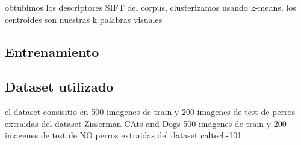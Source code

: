 \documentclass[12pt]{article}
\begin{document}
obtubimos los descriptores SIFT del corpus, clusterizamos usando k-means, los centroides son nuestras k palabras visuales

\subsection{Entrenamiento}

\subsection{Dataset utilizado}
el dataset consisitio en
500 imagenes de train y 200 imagenes de test de perros extraidas del dataset Zisserman CAts and Dogs
500 imagenes de train y 200 imagenes de test de NO perros extraidas del dataset caltech-101

\begin{comment}
En este trabajo se realizó la evaluación de un algoritmo para el reconocimiento
de piel basado en modelos estadísticos de color. 

\subsection{Modelos de color}

Una forma de modelar una característica a detectar es mediante un modelo
estadístico sobre los colores de la imagen. Un pixel con cierto valor $rgb$ es
clasificado por uno de estos modelos como ser efectivamente piel si:

\begin{equation}
    \frac{ \mathbb{P} [ rgb|skin ] }{ \mathbb{P} [ rgb | \neg skin ] } \geq
    \Theta
\end{equation}

con $\Theta$ un umbral que puede ser descrito como función del costo de tener
falsos positivos y falsos negativos:

\begin{equation}
    \Theta = \frac{c_p \mathbb{P} [\neg skin]}{c_n \mathbb{P}[skin]}
\end{equation}

Ahora bien, las distribuciones $\mathbb{P} [ rgb|skin ]$ y $\mathbb{P} [ rgb | \neg
skin ]$ pueden ser determinadas de distintas formas. En el caso de este trabajo, se
utilizó un modelo que describe estas distribuciones como una combinación de
funciones gaussianas.

\subsection{Modelo basado en Mezcla de Gaussianas}


\end{comment}
\end{document}
